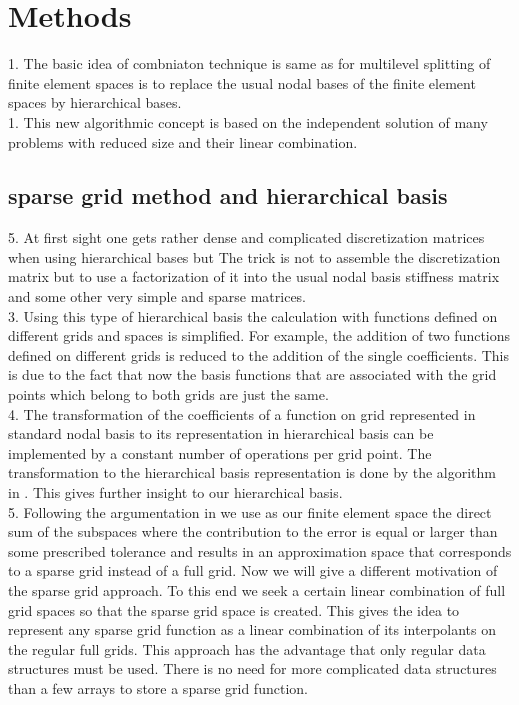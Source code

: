 \chapter{Methods}
\label{chapter:methods}

1. The basic idea of combniaton technique is same as for multilevel splitting of finite element spaces is to replace the usual nodal bases of the finite element spaces by hierarchical bases.\cite{Yserentant1986} \\
1. This new algorithmic concept is based on the independent solution of many problems with reduced size and their linear combination. \cite{Griebel1992}\\

\section{sparse grid method and hierarchical basis}

5. At first sight one gets rather dense and complicated discretization matrices when using hierarchical bases but The trick is not to assemble the discretization matrix but to use a factorization of it into the usual nodal basis stiffness matrix and some other very simple and sparse matrices.\cite{Yserentant1986} \\

3. Using this type of hierarchical basis the calculation with functions defined on different grids and spaces is simplified. For example, the addition of two functions defined on different grids is reduced to the addition of the single coefficients. This is due to the fact that now the basis functions that are associated with the grid points which belong to both grids are just the same. \cite{Griebel1992b} \\

4. The transformation of the coefficients of a function on grid represented in standard nodal basis to its representation in hierarchical basis can be implemented by a constant number of operations per grid point. The transformation to the hierarchical basis representation is done by the algorithm in \cite{Griebel1992b}. This gives further insight to our hierarchical basis.\\

5. Following the argumentation in \cite{Zenger1990} we use as our finite element space the direct sum of the subspaces where the contribution to the error is equal or larger than some prescribed tolerance and results in an approximation space that corresponds to a sparse grid instead of a full grid. Now we will give a different motivation of the sparse grid approach. To this end we seek a certain linear combination of full grid spaces so that the sparse grid space is created. This gives the idea to represent any sparse grid function as a linear combination of its interpolants on the regular full grids. This approach has the advantage that only regular data structures must be used. There is no need for more complicated data structures than a few arrays to store a sparse grid function.\cite{Griebel1992b} \\

